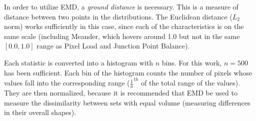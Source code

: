In order to utilize EMD, a \emph{ground distance} is necessary. This is a measure of distance between two points in the distributions. The Euclidean distance ($L_{2}$ norm) works sufficiently in this case,
% 
since each of the characteristics is on the same scale (including Meander, which hovers around 1.0 but not in the same $[0.0, 1.0]$ range as Pixel Load and Junction Point Balance).


Each statistic is converted into a histogram with $n$ bins. For this work, $n = 500$ has been sufficient. 
Each bin of the histogram counts the number of pixels whose values fall into the corresponding range ($\frac{1}{n}^{th}$ of the total range of the values). 
They are then normalized, because it is recommended that EMD be used to measure the dissimilarity between sets with equal volume (measuring differences in their overall shapes). 


